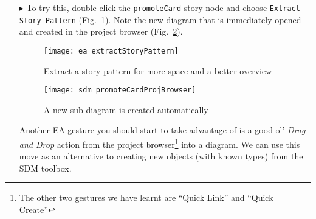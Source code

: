 \begin{itemize}
One great feature of eMolfon (with EA) provides a means of coping with large patterns.\footnote{You thought I was going to say `coping
with our coffee addiction', weren't you?} It might be nice to visualise \emph{small} story patterns directly in their nodes, but for large patterns or complex
control flow, such diagrams would get extremely cumbersome and unwieldy very quickly! This is indeed a popular argument against visual languages and it might
have already crossed your mind (``This is cute, but it'll \emph{never} scale!''). With the right tools and concepts however, even huge diagrams can be
mastered. We support \emph{extracting} story patterns into their own diagrams, and unless the pattern is really concise with 2 or 3 object variables, recommend
this course of action. In other words, eMoflon supports seprating your transformation's pattern layer from the control flow.

\vspace{0.5cm}

\item[$\blacktriangleright$] To try this, double-click the \texttt{promoteCard} story node and choose \texttt{Extract Story Pattern}
(Fig.~\ref{fig:sdm_check_extract_storypattern}). Note the new diagram that is immediately opened and created in the project browser
(Fig.~\ref{fig:sdm_new_sub_diagram}).

\begin{figure}[htbp]
\begin{center}
  \texttt{[image: ea\_extractStoryPattern]}
  \caption{Extract a story pattern for more space and a better overview}
  \label{fig:sdm_check_extract_storypattern}
\end{center}
\end{figure}

\begin{figure}[htbp]
\begin{center}
  \texttt{[image: sdm\_promoteCardProjBrowser]}
  \caption{A new sub diagram is created automatically}
  \label{fig:sdm_new_sub_diagram}
\end{center}
\end{figure}

\newpage

Another EA gesture you should start to take advantage of is a good ol' \emph{Drag and Drop} action from the project browser\footnote{The other two gestures we
have learnt are ``Quick Link'' and ``Quick Create''} into a diagram. We can use this move as an alternative to creating new objects (with known types) from the
SDM toolbox.


\end{itemize}
